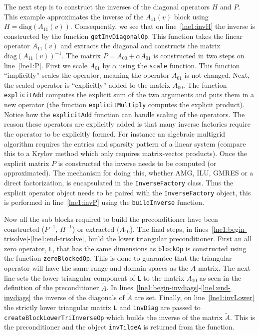 \documentclass[12pt]{article}
\newcommand{\code}[1]{\lstinline[basicstyle=\footnotesize]!#1!}
\newcommand{\diag}[1]{\ensuremath{\mbox{diag}(#1)}}
\begin{document}
The next step is to construct the inverses of the diagonal operators $H$ and $P$. This example
approximates the inverse of the $A_{11}(v)$ block using $H = \diag{A_{11}(v)}$. Consequently,
we see that on line~\ref{lne1:invH} the inverse is constructed by the function \code{getInvDiagonalOp}.
This function takes the linear operator $A_{11}(v)$ and extracts the diagonal and constructs the matrix
$\diag{A_{11}(v)}^{-1}$. The matrix $P = A_{00}+\alpha A_{01}$ is constructed in two steps on
line~\ref{lne1:P}. First we scale $A_{01}$ by $\alpha$ using the \code{scale} function. This
function ``implicitly'' scales the operator, meaning the operator $A_{01}$ is not changed. 
Next, the scaled operator is ``explicitly'' added to the matrix $A_{00}$. The function \code{explicitAdd}
computes the explicit sum of the two arguments and puts them in a new operator (the function
\code{explicitMultiply} computes the explicit product).  Notice how the \code{explicitAdd} function can
handle scaling of the operators.  The reason these operators are
explicitly added is that many inverse factories require the operator to be explicitly formed.
For instance an algebraic multigrid algorithm requires the entries and sparsity pattern of a linear system (compare
this to a Krylov method which only requires matrix-vector products). Once the explicit matrix
$P$ is constructed the inverse needs to be computed (or approximated). The mechanism for doing this,
whether AMG, ILU, GMRES or a direct factorization, is encapsulated in the \code{InverseFactory} class.
Thus the explicit operator object needs to be paired with the \code{InverseFactory} object, this is
performed in line~\ref{lne1:invP} using the \code{buildInverse} function.

Now all the sub blocks required to build the preconditioner have been constructed ($P^{-1}$, $H^{-1}$) or
extracted ($A_{10}$). The final steps, in lines~\ref{lne1:begin-trisolve}-\ref{lne1:end-trisolve},
build the lower triangular preconditioner. First an all zero operator, \code{L}, that has the same dimensions
as \code{blockOp} is constructed using the function \code{zeroBlockedOp}. This is done to guarantee that
the triangular operator will have the same range and domain spaces as the $A$ matrix. The next line
sets the lower triangular component of \code{L} to the matrix $A_{10}$ as seen in the definition of the
preconditioner $\tilde{A}$. In lines~\ref{lne1:begin-invdiags}-\ref{lne1:end-invdiags} the inverse of
the diagonals of $\tilde{A}$ are set.
Finally, on line~\ref{lne1:invLower} the strictly lower triangular matrix \code{L} and \code{invDiag} are passed
to \code{createBlockLowerTriInverseOp} which builds the inverse of the matrix $\tilde{A}$. This is
the preconditioner and the object \code{invTildeA} is returned from the function.
\end{document}
